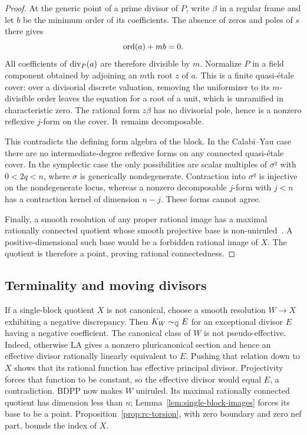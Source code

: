\begin{proof}
At the generic point of a prime divisor of $P$, write $\beta$ in a
regular frame and let $b$ be the minimum order of its coefficients.
The absence of zeros and poles of $s$ there gives
\[
                              \operatorname{ord}(a)+mb=0.
\]
All coefficients of $\operatorname{div}_P(a)$ are therefore divisible by $m$.
Normalize $P$ in a field component obtained by adjoining an $m$th
root $z$ of $a$.  This is a finite quasi-\'etale cover: over a
divisorial discrete valuation, removing the uniformizer to its
$m$-divisible order leaves the equation for a root of a unit, which
is unramified in characteristic zero.  The rational form $z\beta$
has no divisorial pole, hence is a nonzero reflexive $j$-form on the
cover.  It remains decomposable.

This contradicts the defining form algebra of the block.  In the
Calabi--Yau case there are no intermediate-degree reflexive forms on
any connected quasi-\'etale cover.  In the symplectic case the only
possibilities are scalar multiples of $\sigma^q$ with $0<2q<n$,
where $\sigma$ is generically nondegenerate.  Contraction into
$\sigma^q$ is injective on the nondegenerate locus, whereas a
nonzero decomposable $j$-form with $j<n$ has a contraction kernel of
dimension $n-j$.  These forms cannot agree.

Finally, a smooth resolution of any proper rational image has a
maximal rationally connected quotient whose smooth projective base
is non-uniruled~\cite{GHS2003}.  A positive-dimensional such base would
be a forbidden rational image of $X$.  The quotient is therefore a
point, proving rational connectedness.
\end{proof}

\subsection{Terminality and moving divisors}

If a single-block quotient $X$ is not canonical, choose a smooth
resolution $W\to X$ exhibiting a negative discrepancy.  Then
$K_W\sim_{\mathbb Q}E$ for an exceptional divisor $E$ having a negative
coefficient.  The canonical class of $W$ is not pseudo-effective.
Indeed, otherwise LA gives a nonzero pluricanonical section and hence
an effective divisor rationally linearly equivalent to $E$.  Pushing
that relation down to $X$ shows that its rational function has
effective principal divisor.  Projectivity forces that function to
be constant, so the effective divisor would equal $E$, a contradiction.
BDPP now makes $W$ uniruled.  Its maximal rationally connected
quotient has dimension less than $n$; Lemma~\ref{lem:single-block-images}
forces its base to be a point.  Proposition~\ref{prop:rc-torsion},
with zero boundary and zero nef part, bounds the index of $X$.

